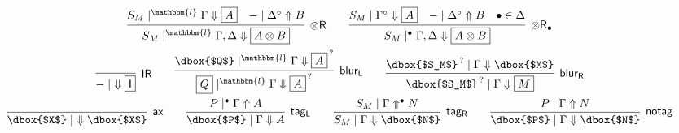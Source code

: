 \documentclass[runningheads]{llncs}
\newcommand{\tr}{\otimes \mathsf{R}}
\newcommand{\lleft}{{\multimap}\mathsf{L}}
\newcommand{\M}{\mathsf{M}}
\newcommand{\unitr}{\mathsf{IR}}
\newcommand{\otR}{\tr}
\newcommand{\IR}{\unitr}
\newcommand{\ax}{\mathsf{ax}}
\newcommand{\ot}{\otimes}
\newcommand{\lolli}{\multimap}
\newcommand{\I}{\mathsf{I}}
\newcommand{\up}{\Uparrow}
\newcommand{\dn}{\Downarrow}
\newcommand{\blurL}{\mathsf{blur_L}}
\newcommand{\blurR}{\mathsf{blur_R}}
\renewcommand{\l}{\mathbbm{l}}
\newcommand{\tagL}{\mathsf{tag_L}}
\newcommand{\tagR}{\mathsf{tag_R}}
\newcommand{\tagM}{\mathsf{notag}}
\begin{document}
\begin{equation}
\begin{array}{c}
{    }
        \\[6pt]
    \infer[\otR]{S_M \mid^\l \Gamma , \Delta \dn \fbox{$A \ot B$}}{
      S_M \mid^\l \Gamma \dn \fbox{$A$}
      &
      - \mid \Delta^\circ \up B
    }
    \qquad
    \infer[\otR_\bullet]{S_M \mid^{\bullet} \Gamma , \Delta \dn \fbox{$A \ot B$}}{
      S_M \mid \Gamma^{\circ} \dn \fbox{$A$}
      &
      - \mid \Delta^{\circ} \up B
      &
      \bullet \in \Delta
    }
    \\[6pt]
    \infer[\IR]{- \mid ~ \dn \fbox{$\I$}}{}
    \qquad
        \infer[\blurL]{\fbox{$Q$} \mid^\l \Gamma \dn \fbox{$A$}^{\,?}}{
      \dbox{$Q$} \mid^\l \Gamma \dn \fbox{$A$}^{\,?}
      }    
    \qquad
        \infer[\blurR]{\dbox{$S_M$}^{\,?} \mid \Gamma \dn \fbox{$M$}}{
      \dbox{$S_M$}^{\,?} \mid \Gamma \dn \dbox{$M$}
    }
    \\[6pt]
    \infer[\ax]{\dbox{$X$} \mid ~ \dn \dbox{$X$}}{}
    \qquad
    \infer[\tagL]{\dbox{$P$} \mid \Gamma \dn A}{
      P \mid^\bullet \Gamma \up A}
    \qquad
    \infer[\tagR]{S_M \mid \Gamma \dn \dbox{$N$}}{
      S_M \mid \Gamma \up^\bullet N }
    \qquad
    \infer[\tagM]{\dbox{$P$} \mid \Gamma \dn \dbox{$N$}}{
    P \mid \Gamma \up N}

\end{array}
\end{equation}
\end{document}
